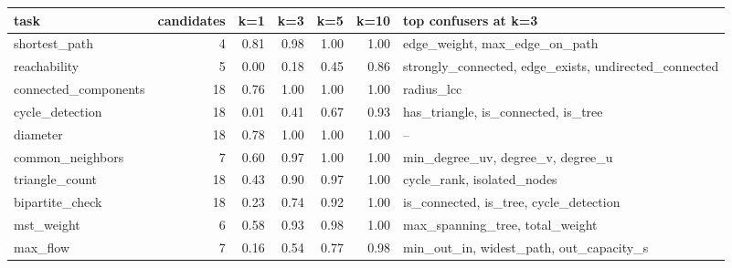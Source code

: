 \begin{tabular}{lrrrrrp{4.5cm}}
\toprule
task & candidates & k=1 & k=3 & k=5 & k=10 & top confusers at k=3 \\
\midrule
shortest\_path & 4 & 0.81 & 0.98 & 1.00 & 1.00 & edge\_weight, max\_edge\_on\_path \\
reachability & 5 & 0.00 & 0.18 & 0.45 & 0.86 & strongly\_connected, edge\_exists, undirected\_connected \\
connected\_components & 18 & 0.76 & 1.00 & 1.00 & 1.00 & radius\_lcc \\
cycle\_detection & 18 & 0.01 & 0.41 & 0.67 & 0.93 & has\_triangle, is\_connected, is\_tree \\
diameter & 18 & 0.78 & 1.00 & 1.00 & 1.00 & -- \\
common\_neighbors & 7 & 0.60 & 0.97 & 1.00 & 1.00 & min\_degree\_uv, degree\_v, degree\_u \\
triangle\_count & 18 & 0.43 & 0.90 & 0.97 & 1.00 & cycle\_rank, isolated\_nodes \\
bipartite\_check & 18 & 0.23 & 0.74 & 0.92 & 1.00 & is\_connected, is\_tree, cycle\_detection \\
mst\_weight & 6 & 0.58 & 0.93 & 0.98 & 1.00 & max\_spanning\_tree, total\_weight \\
max\_flow & 7 & 0.16 & 0.54 & 0.77 & 0.98 & min\_out\_in, widest\_path, out\_capacity\_s \\
\bottomrule
\end{tabular}
